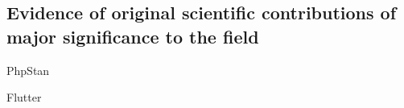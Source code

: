 \subsection{%
    Evidence of \mrls original scientific contributions of major significance to the field%
}
\label{subsec:Contributions}

{PhpStan}

\pagebreak

{Flutter}

\pagebreak

